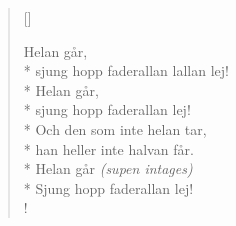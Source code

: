 
\settowidth{\versewidth}{sjung hopp faderallan lej!}



\begin{verse}[\versewidth]

Helan går,\\*
sjung hopp faderallan lallan lej!\\*
Helan går,\\*
sjung hopp faderallan lej!\\*
Och den som inte helan tar,\\*
han heller inte halvan får.\\*
Helan går \emph{(supen intages)}\\*
Sjung hopp faderallan lej!\\!


\end{verse}

